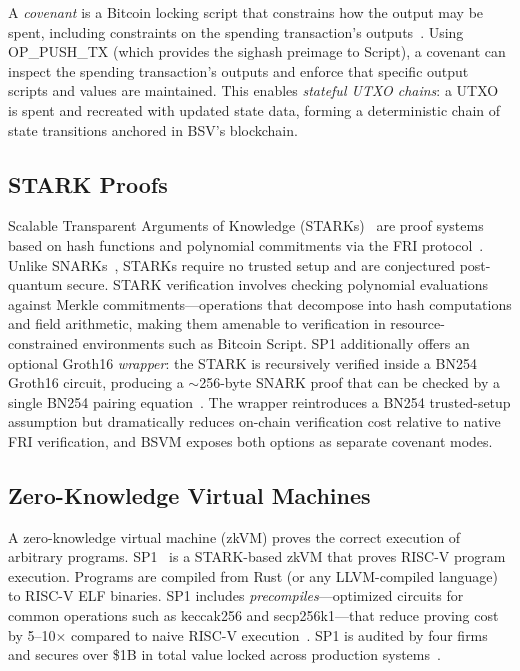 \documentclass[11pt,twocolumn]{article}
\begin{document}
A \emph{covenant} is a Bitcoin locking script that constrains how the output may be spent, including constraints on the spending transaction's outputs~\cite{moser_covenants}. Using OP\_PUSH\_TX (which provides the sighash preimage to Script), a covenant can inspect the spending transaction's outputs and enforce that specific output scripts and values are maintained. This enables \emph{stateful UTXO chains}: a UTXO is spent and recreated with updated state data, forming a deterministic chain of state transitions anchored in BSV's blockchain.

\subsection{STARK Proofs}

Scalable Transparent Arguments of Knowledge (STARKs)~\cite{ben_sasson_stark} are proof systems based on hash functions and polynomial commitments via the FRI protocol~\cite{ben_sasson_fri}. Unlike SNARKs~\cite{groth16}, STARKs require no trusted setup and are conjectured post-quantum secure. STARK verification involves checking polynomial evaluations against Merkle commitments---operations that decompose into hash computations and field arithmetic, making them amenable to verification in resource-constrained environments such as Bitcoin Script. SP1 additionally offers an optional Groth16 \emph{wrapper}: the STARK is recursively verified inside a BN254 Groth16 circuit, producing a $\sim$256-byte SNARK proof that can be checked by a single BN254 pairing equation~\cite{groth16}. The wrapper reintroduces a BN254 trusted-setup assumption but dramatically reduces on-chain verification cost relative to native FRI verification, and BSVM exposes both options as separate covenant modes.

\subsection{Zero-Knowledge Virtual Machines}

A zero-knowledge virtual machine (zkVM) proves the correct execution of arbitrary programs. SP1~\cite{sp1} is a STARK-based zkVM that proves RISC-V program execution. Programs are compiled from Rust (or any LLVM-compiled language) to RISC-V ELF binaries. SP1 includes \emph{precompiles}---optimized circuits for common operations such as keccak256 and secp256k1---that reduce proving cost by 5--10$\times$ compared to naive RISC-V execution~\cite{sp1}. SP1 is audited by four firms and secures over \$1B in total value locked across production systems~\cite{sp1}.
\end{document}
